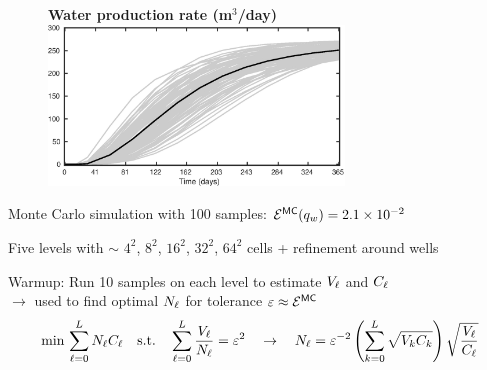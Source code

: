 \begin{frame}{\name{}}
    \begin{figure}
        \centering
        \textbf{Water production rate (m$^3$/day)}
        \includegraphics[width = 0.7\textwidth]{figures/example-2/water-rate.eps}
    \end{figure}
    \begin{squarelist}
        \item Monte Carlo simulation with 100 samples: $\err^\mc(q_w) = 2.1\times10^{-2}$
    \end{squarelist}
\end{frame}

\begin{frame}{\name{}}
    \begin{figure}
        \centering
    \end{figure}
    \begin{squarelist}
        \item<1-> Five levels with $\sim$ $4^2$, $8^2$, $16^2$, $32^2$, $64^2$ cells + refinement around wells
        \item<2-> Warmup: Run 10 samples on each level to estimate $\vara_\ell$ and $\cost_\ell$ \\
        $\rightarrow$ used to find optimal $\nsamp_\ell$ for tolerance $\tol \approx \err^{\mc}$
         \begin{equation*}
            \min\, \sum_{\ell = 0}^\nlev \nsamp_\ell \cost_\ell \quad \text{s.t.} \quad \sum_{\ell = 0}^\nlev\frac{\vara_\ell}{\nsamp_\ell} = \tol^2 \quad \rightarrow \quad \nsamp_\ell = \tol^{-2}\left(\sum_{k = 0}^\nlev \sqrt{\vara_k \cost_k}\right)\sqrt{\frac{\vara_\ell}{\cost_\ell}}
        \end{equation*}
    \end{squarelist}
\end{frame}

